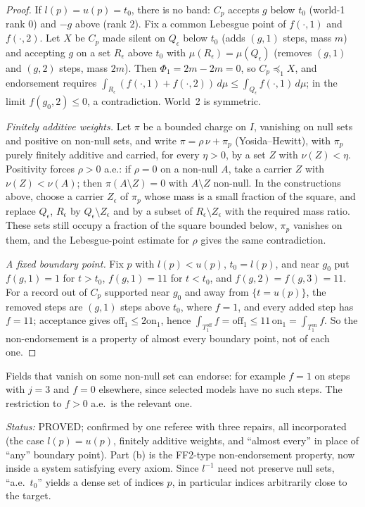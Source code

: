 \documentclass[11pt]{article}
\theoremstyle{definition}\newtheorem{definition}[theorem]{Definition}
\theoremstyle{remark}\newtheorem{remark}[theorem]{Remark}
\newcommand{\on}{\mathrm{on}}
\newcommand{\off}{\mathrm{off}}
\newcommand{\status}[1]{\par\noindent\emph{Status:} #1\par}
\begin{document}
\begin{proof}
If $l(p)=u(p)=t_0$, there is no band: $C_p$ accepts $g$ below $t_0$ (world-1
rank $0$) and $-g$ above (rank $2$). Fix a common Lebesgue point of
$f(\cdot,1)$ and $f(\cdot,2)$. Let $X$ be $C_p$ made silent on $Q_\epsilon$
below $t_0$ (adds $(g,1)$ steps, mass $m$) and accepting $g$ on a set
$R_\epsilon$ above $t_0$ with $\mu(R_\epsilon)=\mu(Q_\epsilon)$ (removes $(g,1)$
and $(g,2)$ steps, mass $2m$). Then $\Phi_1=2m-2m=0$, so $C_p\preceq_1X$, and
endorsement requires $\int_{R_\epsilon}(f(\cdot,1)+f(\cdot,2))\,d\mu\le
\int_{Q_\epsilon}f(\cdot,1)\,d\mu$; in the limit $f(g_0,2)\le0$, a
contradiction. World~2 is symmetric.

\emph{Finitely additive weights.} Let $\pi$ be a bounded charge on $I$,
vanishing on null sets and positive on non-null sets, and write
$\pi=\rho\,\nu+\pi_p$ (Yosida--Hewitt), with $\pi_p$ purely finitely additive
and carried, for every $\eta>0$, by a set $Z$ with $\nu(Z)<\eta$. Positivity
forces $\rho>0$ a.e.: if $\rho=0$ on a non-null $A$, take a carrier $Z$ with
$\nu(Z)<\nu(A)$; then $\pi(A\setminus Z)=0$ with $A\setminus Z$ non-null. In
the constructions above, choose a carrier $Z_\epsilon$ of $\pi_p$ whose mass is
a small fraction of the square, and replace $Q_\epsilon$, $R_\epsilon$ by
$Q_\epsilon\setminus Z_\epsilon$ and by a subset of $R_\epsilon\setminus
Z_\epsilon$ with the required mass ratio. These sets still occupy a fraction of
the square bounded below, $\pi_p$ vanishes on them, and the Lebesgue-point
estimate for $\rho$ gives the same contradiction.

\emph{A fixed boundary point.} Fix $p$ with $l(p)<u(p)$, $t_0=l(p)$, and near
$g_0$ put $f(g,1)=1$ for $t>t_0$, $f(g,1)=11$ for $t<t_0$, and
$f(g,2)=f(g,3)=11$. For a record out of $C_p$ supported near $g_0$ and away
from $\{t=u(p)\}$, the removed steps are $(g,1)$ steps above $t_0$, where $f=1$,
and every added step has $f=11$; acceptance gives $\off_1\le2\on_1$, hence
$\int_{T^\off_1}f=\off_1\le11\,\on_1=\int_{T^\on_1}f$. So the non-endorsement is
a property of almost every boundary point, not of each one.
\end{proof}

\noindent Fields that vanish on some non-null set can endorse: for example
$f=1$ on steps with $j=3$ and $f=0$ elsewhere, since selected models have no
such steps. The restriction to $f>0$ a.e.\ is the relevant one.

\status{PROVED; confirmed by one referee with three repairs, all
incorporated (the case $l(p)=u(p)$, finitely additive weights, and ``almost
every'' in place of ``any'' boundary point). Part (b) is the FF2-type
non-endorsement property, now inside a system satisfying every axiom. Since
$l^{-1}$ need not preserve null sets, ``a.e.\ $t_0$'' yields a dense set of
indices $p$, in particular indices arbitrarily close to the target.}
\end{document}

